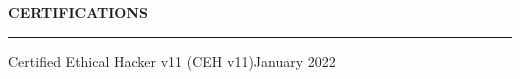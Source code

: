 \noindent\textcolor{themecolor}{\textbf{CERTIFICATIONS}}

\vspace{2mm}
\hrule
\vspace{3mm}

\begin{verbose}{Certified Ethical Hacker v11 (CEH v11)}{January 2022}{}
\end{verbose}